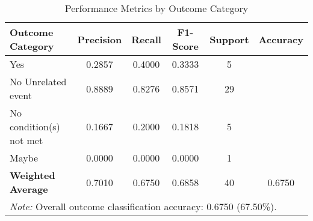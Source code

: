 \begin{table}[!ht]
\centering
\caption{Performance Metrics by Outcome Category}
\label{tab:classification_metrics}
\begin{tabular}{lccccc}
\toprule
\textbf{Outcome Category} & \textbf{Precision} & \textbf{Recall} & \textbf{F1-Score} & \textbf{Support} & \textbf{Accuracy} \\
\midrule
Yes & 0.2857 & 0.4000 & 0.3333 & 5 & \multirow{1}{*}{} \\
No \- Unrelated event & 0.8889 & 0.8276 & 0.8571 & 29 & \multirow{1}{*}{} \\
No \- condition(s) not met & 0.1667 & 0.2000 & 0.1818 & 5 & \multirow{1}{*}{} \\
Maybe & 0.0000 & 0.0000 & 0.0000 & 1 & \multirow{1}{*}{} \\
\midrule
\textbf{Weighted Average} & 0.7010 & 0.6750 & 0.6858 & 40 & 0.6750 \\
\bottomrule
\multicolumn{6}{p{14cm}}{\textit{Note:} Overall outcome classification accuracy: 0.6750 (67.50\%).} \\
\end{tabular}
\end{table}
